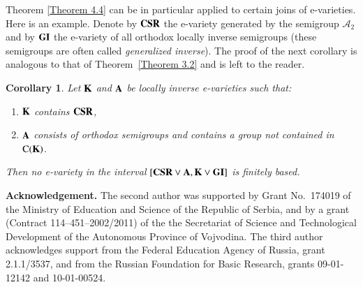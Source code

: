 \documentclass[preprint,1p,times]{elsarticle}
\numberwithin{equation}{section}
\newtheorem{Cor}[Thm]{Corollary}
\theoremstyle{remark}
\def\pv#1{{\bf #1}}
\def\Co{{\mathrm C}}
\begin{document}
Theorem \ref{Theorem 4.4} can be in particular applied to certain joins of e-varieties. Here is an example. Denote by
$\pv{CSR}$ the e-variety generated by the semigroup $\mathcal{A}_2$  and by $\pv {GI}$ the e-variety of all orthodox
locally inverse semigroups (these semigroups are often called \emph{generalized inverse}). The proof of the next
corollary is analogous to that of Theorem~\ref{Theorem 3.2} and is left to the reader.

\begin{Cor} \label{Corollary 4.6} Let $\pv K$ and $\pv A$ be locally inverse
e-varieties such that:
\renewcommand{\labelenumi}{(\theenumi)}
\begin{enumerate}
\item $\pv K$ contains $\pv{CSR}$,
\item $\pv A$ consists of orthodox semigroups and contains a group
not contained in $\Co(\pv K)$.
\end{enumerate}
Then no e-variety in the interval $[\pv{CSR}\vee \pv A, \pv K\vee\pv {GI}]$ is finitely based.
\end{Cor}

\noindent\textbf{Acknowledgement.} The second author was supported by Grant No.\ 174019 of the Ministry of Education
and Science of the Republic of Serbia, and by a grant (Contract 114--451--2002/2011) of the the Secretariat of Science
and Technological Development of the Autonomous Province of Vojvodina. The third author acknowledges support from the
Federal Education Agency of Russia, grant 2.1.1/3537, and from the Russian Foundation for Basic Research, grants
09-01-12142 and 10-01-00524.
\end{document}
